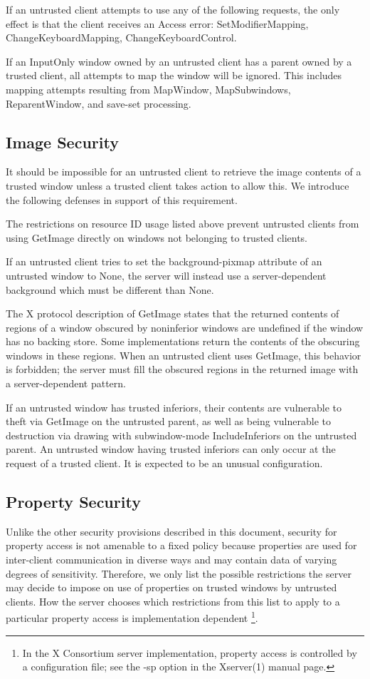 If an untrusted client attempts to use any of the following requests,
the only effect is that the client receives an Access error:
SetModifierMapping, ChangeKeyboardMapping, ChangeKeyboardControl.

If an InputOnly window owned by an untrusted client has a parent owned
by a trusted client, all attempts to map the window will be ignored.
This includes mapping attempts resulting from MapWindow,
MapSubwindows, ReparentWindow, and save-set processing.

\subsection{Image Security}

It should be impossible for an untrusted client to retrieve the image
contents of a trusted window unless a trusted client takes action to
allow this.  We introduce the following defenses in support of this
requirement.

The restrictions on resource ID usage listed above prevent untrusted
clients from using GetImage directly on windows not belonging to
trusted clients.

If an untrusted client tries to set the background-pixmap attribute of
an untrusted window to None, the server will instead use a
server-dependent background which must be different than None.

The X protocol description of GetImage states that the returned
contents of regions of a window obscured by noninferior windows are
undefined if the window has no backing store.  Some implementations
return the contents of the obscuring windows in these regions.  When
an untrusted client uses GetImage, this behavior is forbidden; the
server must fill the obscured regions in the returned image with a
server-dependent pattern.

If an untrusted window has trusted inferiors, their contents are
vulnerable to theft via GetImage on the untrusted parent, as well as
being vulnerable to destruction via drawing with subwindow-mode
IncludeInferiors on the untrusted parent.  An untrusted window having
trusted inferiors can only occur at the request of a trusted client.
It is expected to be an unusual configuration.

\subsection{Property Security}

Unlike the other security provisions described in this document,
security for property access is not amenable to a fixed policy because
properties are used for inter-client communication in diverse ways and
may contain data of varying degrees of sensitivity.  Therefore, we
only list the possible restrictions the server may decide to impose on
use of properties on trusted windows by untrusted clients.  How the
server chooses which restrictions from this list to apply to a
particular property access is implementation dependent
\footnote{In the X Consortium server implementation, property access
is controlled by a configuration file; see the -sp option in the
Xserver(1) manual page.}.


